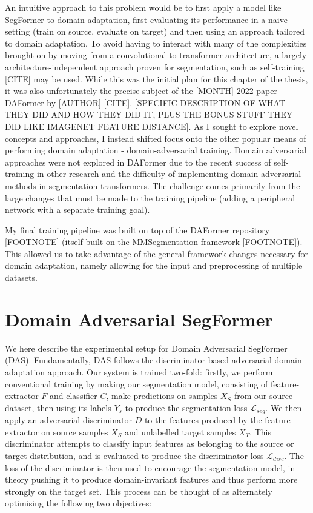 \documentclass[a4paper,12pt]{report}
\begin{document}
An intuitive approach to this problem would be to first apply a model like SegFormer to domain adaptation, first evaluating its performance in a naive setting (train on source, evaluate on target) and then using an approach tailored to domain adaptation. To avoid having to interact with many of the complexities brought on by moving from a convolutional to transformer architecture, a largely architecture-independent approach proven for segmentation, such as self-training [CITE] may be used. While this was the initial plan for this chapter of the thesis, it was also unfortunately the precise subject of the [MONTH] 2022 paper DAFormer by [AUTHOR] [CITE]. [SPECIFIC DESCRIPTION OF WHAT THEY DID AND HOW THEY DID IT, PLUS THE BONUS STUFF THEY DID LIKE IMAGENET FEATURE DISTANCE]. As I sought to explore novel concepts and approaches, I instead shifted focus onto the other popular means of performing domain adaptation - domain-adversarial training. Domain adversarial approaches were not explored in DAFormer due to the recent success of self-training in other research and the difficulty of implementing domain adversarial methods in segmentation transformers. The challenge comes primarily from the large changes that must be made to the training pipeline (adding a peripheral network with a separate training goal).

My final training pipeline was built on top of the DAFormer repository [FOOTNOTE] (itself built on the MMSegmentation framework [FOOTNOTE]). This allowed us to take advantage of the general framework changes necessary for domain adaptation, namely allowing for the input and preprocessing of multiple datasets.


\section{Domain Adversarial SegFormer}

We here describe the experimental setup for Domain Adversarial SegFormer (DAS). Fundamentally, DAS follows the discriminator-based adversarial domain adaptation approach. Our system is trained two-fold: firstly, we perform conventional training by making our segmentation model, consisting of feature-extractor $F$ and classifier $C$, make predictions on samples $X_S$ from our source dataset, then using its labels $Y_s$ to produce the segmentation loss $\mathcal{L}_{seg}$. We then apply an adversarial discriminator $D$ to the features produced by the feature-extractor on source samples $X_S$ and unlabelled target samples $X_T$. This discriminator attempts to classify input features as belonging to the source or target distribution, and is evaluated to produce the discriminator loss $\mathcal{L}_{disc}$. The loss of the discriminator is then used to encourage the segmentation model, in theory pushing it to produce domain-invariant features and thus perform more strongly on the target set. This process can be thought of as alternately optimising the following two objectives:
\end{document}
